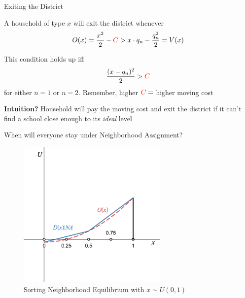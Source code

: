 \documentclass[notes,11pt, aspectratio=169]{beamer}
\newenvironment{wideitemize}{\itemize\addtolength{\itemsep}{10pt}}{\enditemize}
\begin{document}
\begin{frame}{Exiting the District}
\begin{wideitemize}
\item A household of type $x$ will exit the district whenever
\begin{equation*}
O(x) = \frac{x^2}{2} - \textcolor{red}{C}  >   x \cdot q_n - \frac{q_n^2}{2} = V(x)
\end{equation*}
\item This condition holds up iff
\begin{equation*}
 \frac{(x-q_n)^2}{2} > \textcolor{red}{C}
\end{equation*}
for either $n=1$ or $n=2$. Remember, higher $\textcolor{red}{C} = $ higher moving cost
\item \textbf{Intuition?} Household will pay the moving cost and exit the district if it can't find a school close enough to its \textit{ideal} level
\end{wideitemize}
\end{frame}

\begin{frame}{When will everyone stay under Neighborhood Assignment?}
\begin{figure}
\centering
\includegraphics[width=0.65\textwidth]{figures/neighborhood.png}
\caption{Sorting Neighborhood Equilibrium with $x \sim U(0,1)$}
\end{figure}
\end{frame}
\end{document}
